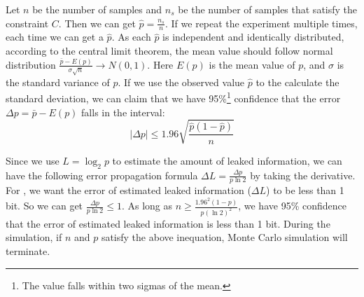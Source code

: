 Let $n$ be the number of samples and $n_s$ be the number of samples that satisfy
the constraint $C$. Then we can get $\hat{p} = \frac{n_s}{n}$. If we repeat the
experiment multiple times, each time we can get a $\hat{p}$. As each
$\hat{p}$ is independent and identically distributed, according to the central limit
theorem, the mean value should follow normal distribution
$ \frac{\bar{p}-E(p)}{\sigma\sqrt{n}} \rightarrow N(0,1) $. Here $E(p)$ is the
mean value of $p$, and $\sigma$ is the standard variance of $p$. If we use the
observed value $\hat{p}$ to the calculate the standard deviation, we can claim that
we have 95\%\footnote{The value falls within two sigmas of the mean.} 
confidence that the error $\Delta p= \bar{p} - E(p)$ falls in the interval:
$$ |\Delta p| \leq 1.96\sqrt{\frac{ \hat{p} (1- \hat{p} )}{n}}$$

Since we use $L = \log_{2}p$ to estimate the amount of leaked information, we
can have the following error propagation formula $\Delta L = \frac{\Delta
p}{p\ln2}$ by taking the derivative. For \tool, we want the error of estimated leaked
information ($\Delta L$) to be less than 1 bit. So we can get $\frac{\Delta
p}{p\ln2} \leq 1$. As long as $ n \geq \frac{1.96^2(1-p)}{p(\ln2)^2}$, we have
95\% confidence that the error of estimated leaked information is less than 1 bit.
During the simulation, if $n$ and $p$ satisfy the above inequation, Monte Carlo
simulation will terminate.

